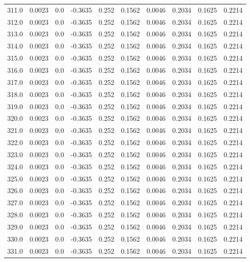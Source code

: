 \begin{longtable}{lrrrrrrrrr}
311.0 & 0.0023 & 0.0 & -0.3635 & 0.252 & 0.1562 & 0.0046 & 0.2034 & 0.1625 & 0.2214 \\
312.0 & 0.0023 & 0.0 & -0.3635 & 0.252 & 0.1562 & 0.0046 & 0.2034 & 0.1625 & 0.2214 \\
313.0 & 0.0023 & 0.0 & -0.3635 & 0.252 & 0.1562 & 0.0046 & 0.2034 & 0.1625 & 0.2214 \\
314.0 & 0.0023 & 0.0 & -0.3635 & 0.252 & 0.1562 & 0.0046 & 0.2034 & 0.1625 & 0.2214 \\
315.0 & 0.0023 & 0.0 & -0.3635 & 0.252 & 0.1562 & 0.0046 & 0.2034 & 0.1625 & 0.2214 \\
316.0 & 0.0023 & 0.0 & -0.3635 & 0.252 & 0.1562 & 0.0046 & 0.2034 & 0.1625 & 0.2214 \\
317.0 & 0.0023 & 0.0 & -0.3635 & 0.252 & 0.1562 & 0.0046 & 0.2034 & 0.1625 & 0.2214 \\
318.0 & 0.0023 & 0.0 & -0.3635 & 0.252 & 0.1562 & 0.0046 & 0.2034 & 0.1625 & 0.2214 \\
319.0 & 0.0023 & 0.0 & -0.3635 & 0.252 & 0.1562 & 0.0046 & 0.2034 & 0.1625 & 0.2214 \\
320.0 & 0.0023 & 0.0 & -0.3635 & 0.252 & 0.1562 & 0.0046 & 0.2034 & 0.1625 & 0.2214 \\
321.0 & 0.0023 & 0.0 & -0.3635 & 0.252 & 0.1562 & 0.0046 & 0.2034 & 0.1625 & 0.2214 \\
322.0 & 0.0023 & 0.0 & -0.3635 & 0.252 & 0.1562 & 0.0046 & 0.2034 & 0.1625 & 0.2214 \\
323.0 & 0.0023 & 0.0 & -0.3635 & 0.252 & 0.1562 & 0.0046 & 0.2034 & 0.1625 & 0.2214 \\
324.0 & 0.0023 & 0.0 & -0.3635 & 0.252 & 0.1562 & 0.0046 & 0.2034 & 0.1625 & 0.2214 \\
325.0 & 0.0023 & 0.0 & -0.3635 & 0.252 & 0.1562 & 0.0046 & 0.2034 & 0.1625 & 0.2214 \\
326.0 & 0.0023 & 0.0 & -0.3635 & 0.252 & 0.1562 & 0.0046 & 0.2034 & 0.1625 & 0.2214 \\
327.0 & 0.0023 & 0.0 & -0.3635 & 0.252 & 0.1562 & 0.0046 & 0.2034 & 0.1625 & 0.2214 \\
328.0 & 0.0023 & 0.0 & -0.3635 & 0.252 & 0.1562 & 0.0046 & 0.2034 & 0.1625 & 0.2214 \\
329.0 & 0.0023 & 0.0 & -0.3635 & 0.252 & 0.1562 & 0.0046 & 0.2034 & 0.1625 & 0.2214 \\
330.0 & 0.0023 & 0.0 & -0.3635 & 0.252 & 0.1562 & 0.0046 & 0.2034 & 0.1625 & 0.2214 \\
331.0 & 0.0023 & 0.0 & -0.3635 & 0.252 & 0.1562 & 0.0046 & 0.2034 & 0.1625 & 0.2214 \\

\end{longtable}
